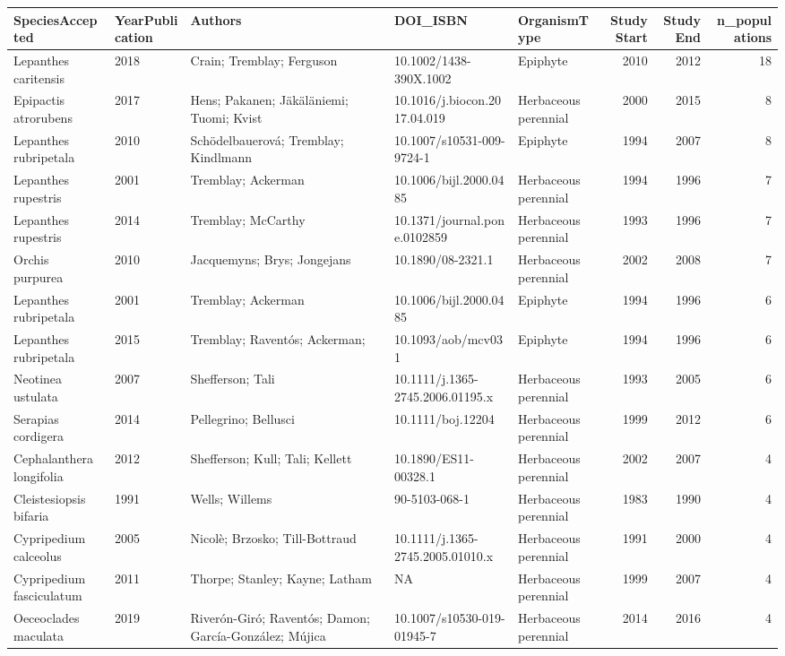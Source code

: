 \documentclass[
]{book}
\theoremstyle{definition}
\theoremstyle{definition}
\theoremstyle{definition}
\theoremstyle{definition}
\theoremstyle{remark}
\begin{document}
\begin{tabular}{l|l|l|l|l|r|r|r}
\hline
SpeciesAccepted & YearPublication & Authors & DOI\_ISBN & OrganismType & StudyStart & StudyEnd & n\_populations\\
\hline
Lepanthes caritensis & 2018 & Crain; Tremblay; Ferguson & 10.1002/1438-390X.1002 & Epiphyte & 2010 & 2012 & 18\\
\hline
Epipactis atrorubens & 2017 & Hens; Pakanen; Jäkäläniemi; Tuomi; Kvist & 10.1016/j.biocon.2017.04.019 & Herbaceous perennial & 2000 & 2015 & 8\\
\hline
Lepanthes rubripetala & 2010 & Schödelbauerová; Tremblay; Kindlmann & 10.1007/s10531-009-9724-1 & Epiphyte & 1994 & 2007 & 8\\
\hline
Lepanthes rupestris & 2001 & Tremblay; Ackerman & 10.1006/bijl.2000.0485 & Herbaceous perennial & 1994 & 1996 & 7\\
\hline
Lepanthes rupestris & 2014 & Tremblay; McCarthy & 10.1371/journal.pone.0102859 & Herbaceous perennial & 1993 & 1996 & 7\\
\hline
Orchis purpurea & 2010 & Jacquemyns; Brys; Jongejans & 10.1890/08-2321.1 & Herbaceous perennial & 2002 & 2008 & 7\\
\hline
Lepanthes rubripetala & 2001 & Tremblay; Ackerman & 10.1006/bijl.2000.0485 & Epiphyte & 1994 & 1996 & 6\\
\hline
Lepanthes rubripetala & 2015 & Tremblay; Raventós; Ackerman; & 10.1093/aob/mcv031 & Epiphyte & 1994 & 1996 & 6\\
\hline
Neotinea ustulata & 2007 & Shefferson; Tali & 10.1111/j.1365-2745.2006.01195.x & Herbaceous perennial & 1993 & 2005 & 6\\
\hline
Serapias cordigera & 2014 & Pellegrino; Bellusci & 10.1111/boj.12204 & Herbaceous perennial & 1999 & 2012 & 6\\
\hline
Cephalanthera longifolia & 2012 & Shefferson; Kull; Tali; Kellett & 10.1890/ES11-00328.1 & Herbaceous perennial & 2002 & 2007 & 4\\
\hline
Cleistesiopsis bifaria & 1991 & Wells; Willems & 90-5103-068-1 & Herbaceous perennial & 1983 & 1990 & 4\\
\hline
Cypripedium calceolus & 2005 & Nicolè; Brzosko; Till-Bottraud & 10.1111/j.1365-2745.2005.01010.x & Herbaceous perennial & 1991 & 2000 & 4\\
\hline
Cypripedium fasciculatum & 2011 & Thorpe; Stanley; Kayne; Latham & NA & Herbaceous perennial & 1999 & 2007 & 4\\
\hline
Oeceoclades maculata & 2019 & Riverón-Giró; Raventós; Damon; García-González; Mújica & 10.1007/s10530-019-01945-7 & Herbaceous perennial & 2014 & 2016 & 4\\

\end{tabular}
\end{document}
